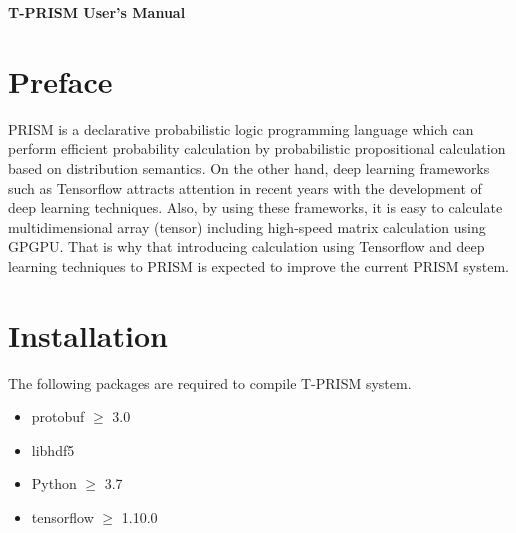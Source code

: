 \documentclass[a4paper]{report}
\begin{document}
	\begin{center}
		\par\vspace*{3cm}\par
		{\Huge\bf T-PRISM User's Manual}\par\vspace*{0.5cm}\par
		{\Large }\par\vspace*{12cm}\par
		
		
		
		\par\vspace*{2cm}\par
		
	\end{center}
	\thispagestyle{empty}
	\setcounter{page}{0}%
	\clearpage
	
	
\section*{Preface}

PRISM is a declarative probabilistic logic programming language which can perform efficient probability calculation by probabilistic propositional calculation based on distribution semantics.
On the other hand, deep learning frameworks such as Tensorflow attracts attention in recent years with the development of deep learning techniques.
Also, by using these frameworks, it is easy to calculate multidimensional array (tensor) including high-speed matrix calculation using GPGPU.
That is why that introducing calculation using Tensorflow and deep learning techniques to PRISM is expected to improve the current PRISM system.


\section*{Installation}
The following packages are required to compile T-PRISM system.
\begin{itemize}
	\item protobuf   $\geq$ 3.0
	\item libhdf5    
	\item Python     $\geq$ 3.7
	\item tensorflow $\geq$ 1.10.0
\end{itemize}
\end{document}
